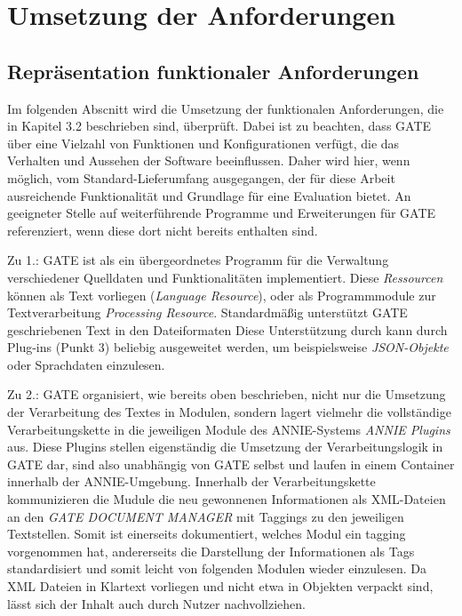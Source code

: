\documentclass[12pt]{report}
\begin{document}
\section{Umsetzung der Anforderungen}

\subsection{Repräsentation funktionaler Anforderungen}
Im folgenden Abscnitt wird die Umsetzung der funktionalen Anforderungen, die in Kapitel 3.2 beschrieben sind, überprüft. Dabei ist zu beachten, dass GATE über eine Vielzahl von Funktionen und Konfigurationen verfügt, die das Verhalten und Aussehen der Software beeinflussen. Daher wird hier, wenn möglich, vom Standard-Lieferumfang ausgegangen, der für diese Arbeit ausreichende Funktionalität und Grundlage für eine Evaluation bietet. An geeigneter Stelle auf weiterführende Programme und Erweiterungen für GATE referenziert, wenn diese dort nicht bereits enthalten sind.

Zu 1.: GATE ist als ein übergeordnetes Programm für die Verwaltung verschiedener Quelldaten und Funktionalitäten implementiert. Diese \textit{Ressourcen} können als Text vorliegen (\textit{Language Resource}), oder als Programmmodule zur Textverarbeitung \textit{Processing Resource}. Standardmäßig unterstützt GATE geschriebenen Text in den Dateiformaten  Diese Unterstützung durch kann durch Plug-ins (Punkt 3) beliebig ausgeweitet werden, um beispielsweise \textit{JSON-Objekte} oder Sprachdaten einzulesen.

Zu 2.: GATE organisiert, wie bereits oben beschrieben, nicht nur die Umsetzung der Verarbeitung des Textes in Modulen, sondern lagert vielmehr die vollständige Verarbeitungskette in die jeweiligen Module des ANNIE-Systems \textit{ANNIE Plugins} aus. Diese Plugins stellen eigenständig die Umsetzung der Verarbeitungslogik in GATE dar, sind also unabhängig von GATE selbst und laufen in einem Container innerhalb der ANNIE-Umgebung. Innerhalb der Verarbeitungskette kommunizieren die Mudule die neu gewonnenen Informationen als XML-Dateien an den \textit{GATE DOCUMENT MANAGER} mit Taggings zu den jeweiligen Textstellen. Somit ist einerseits dokumentiert, welches Modul ein tagging vorgenommen hat,  andererseits die Darstellung der Informationen als Tags standardisiert und somit leicht von folgenden Modulen wieder einzulesen. Da XML Dateien in Klartext vorliegen und nicht etwa in Objekten verpackt sind, lässt sich der Inhalt auch durch Nutzer nachvollziehen.
\end{document}
